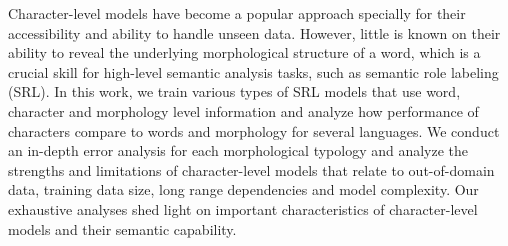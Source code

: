 Character-level models have become a popular approach specially for their accessibility and ability to handle unseen data. However, little is known on their ability to reveal the underlying morphological structure of a word, which is a crucial skill for high-level semantic analysis tasks, such as semantic role labeling (SRL). In this work, we train various types of SRL models that use word, character and morphology level information and analyze how performance of characters compare to words and morphology for several languages. We conduct an in-depth error analysis for each morphological typology and analyze the strengths and limitations of character-level models that relate to out-of-domain data, training data size, long range dependencies and model complexity. Our exhaustive analyses shed light on important characteristics of character-level models and their semantic capability.
